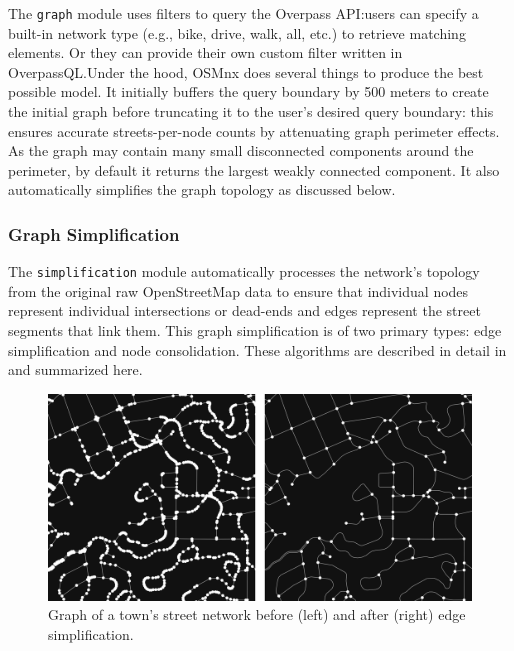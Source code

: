 \documentclass[12pt,letterpaper]{article} %
\begin{document}
The \texttt{graph} module uses filters to query the Overpass API:\@ users can specify a built-in network type (e.g., bike, drive, walk, all, etc.) to retrieve matching elements. Or they can provide their own custom filter written in OverpassQL.\@ Under the hood, OSMnx does several things to produce the best possible model. It initially buffers the query boundary by 500 meters to create the initial graph before truncating it to the user's desired query boundary: this ensures accurate streets-per-node counts by attenuating graph perimeter effects. As the graph may contain many small disconnected components around the perimeter, by default it returns the largest weakly connected component. It also automatically simplifies the graph topology as discussed below.

\subsubsection{Graph Simplification}

The \texttt{simplification} module automatically processes the network's topology from the original raw OpenStreetMap data to ensure that individual nodes represent individual intersections or dead-ends and edges represent the street segments that link them. This graph simplification is of two primary types: edge simplification and node consolidation. These algorithms are described in detail in \citet{boeing_graph_2024} and summarized here.

\begin{figure}[tbp]
    \centering
    \includegraphics[width=1\textwidth]{fig_graph_simplification.png}
    \caption{Graph of a town's street network before (left) and after (right) edge simplification.}\label{fig:graph_simplification}
\end{figure}
\end{document}
